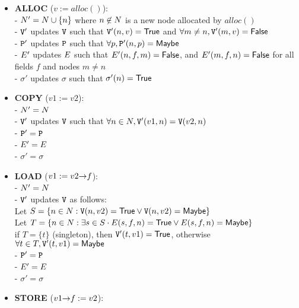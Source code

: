 \begin{itemize}
  \item \textbf{ALLOC} ($v := alloc()$): \\
    - $N' = N \cup \{n\}$ where $n \not \in N$ is a new node allocated by $alloc()$ \\
    - $\mathtt{V}'$ updates $\mathtt{V}$ such that $\mathtt{V}'(n, v) = \mathsf{True}$ and $\forall m \neq n, \mathtt{V}'(m, v) = \mathsf{False}$ \\
    - $\mathtt{P}'$ updates $\mathtt{P}$ such that $\forall p, \mathtt{P}'(n, p) = \mathsf{Maybe}$ \\
    - $E'$ updates $E$ such that $E'(n,f,m) = \mathsf{False}$, and $E'(m,f,n) = \mathsf{False}$ for all fields $f$ and nodes $m \neq n$ \\
    - $\sigma'$ updates $\sigma$ such that $\sigma'(n) = \mathsf{True}$
  \item \textbf{COPY} ($v1 := v2$): \\
    - $N' = N$ \\
    - $\mathtt{V}'$ updates $\mathtt{V}$ such that $\forall n \in N, \mathtt{V}'(v1, n) = \mathtt{V}(v2, n)$ \\
    - $\mathtt{P}' = \mathtt{P}$ \\
    - $E' = E$ \\
    - $\sigma' = \sigma$
  \item \textbf{LOAD} ($v1 := v2 \mathtt{->} f$): \\
    - $N' = N$ \\
    - $\mathtt{V}'$ updates $\mathtt{V}$ as follows: \\
      \hspace*{1em} Let $S = \{n \in N : \mathtt{V}(n, v2) = \mathsf{True} \vee \mathtt{V}(n, v2) = \mathsf{Maybe}\}$ \\
      \hspace*{1em} Let $T = \{n \in N : \exists s \in S \cdot E(s, f, n) = \mathsf{True} \vee E(s, f, n) = \mathsf{Maybe}\}$ \\
      \hspace*{1em} if $T = \{t\}$ (singleton), then $\mathtt{V}'(t, v1) = \mathsf{True}$, otherwise $\forall t \in T, \mathtt{V}'(t, v1) = \mathsf{Maybe}$ \\
    - $\mathtt{P}' = \mathtt{P}$ \\
    - $E' = E$ \\
    - $\sigma' = \sigma$
  \item \textbf{STORE} ($v1 \mathtt{->} f := v2$): \\

\end{itemize}
